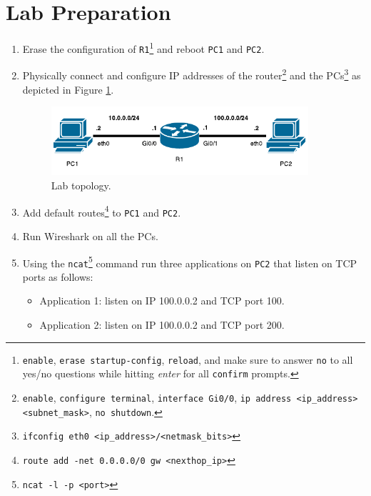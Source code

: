 \documentclass[pdftex,12pt,a4paper]{article}
\begin{document}
    \section{Lab Preparation}
        \begin{enumerate}
            \item Erase the configuration of
                \texttt{R1}\footnote{\texttt{enable}, \texttt{erase
                startup-config}, \texttt{reload}, and make sure to answer
                \texttt{no} to all yes/no questions while hitting \emph{enter} for
                all \texttt{confirm} prompts.} and reboot \texttt{PC1} and
                \texttt{PC2}.
            \item Physically connect and configure IP addresses of the
                router\footnote{\texttt{enable}, \texttt{configure terminal},
                \texttt{interface Gi0/0}, \texttt{ip address <ip\_address>
                <subnet\_mask>}, \texttt{no shutdown}.} and the
                PCs\footnote{\texttt{ifconfig eth0
                <ip\_address>/<netmask\_bits>}} as depicted in Figure
                \ref{fig:labtop}.

                \begin{figure}[tbh]
                    \centering
                    \includegraphics[width=0.9\textwidth]{figures/npat}
                    \caption{Lab topology.}
                    \label{fig:labtop}
                \end{figure}

           \item Add default routes\footnote{\texttt{route add -net
               0.0.0.0/0 gw <nexthop\_ip>}} to \texttt{PC1} and \texttt{PC2}.

           \item Run Wireshark on all the PCs.

           \item Using the \texttt{ncat}\footnote{\texttt{ncat -l -p <port>}}
               command run three applications on \texttt{PC2} that listen on
               TCP ports as follows:
                \begin{itemize}
                    \item Application 1: listen on IP 100.0.0.2 and TCP port 100.
                    \item Application 2: listen on IP 100.0.0.2 and TCP port 200.
                \end{itemize}


\end{enumerate}
\end{document}
